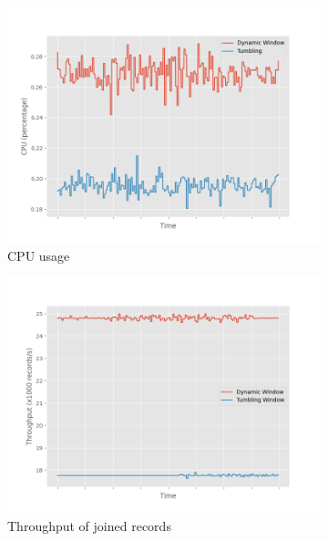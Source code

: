 \begin{figure}
    \begin{subfigure}[b]{0.5\textwidth}
        \includegraphics[width=\textwidth]{fig/periodic/cpu_comparison.png}
        \caption{CPU usage}
        \label{fig:periodic_cpu}
    \end{subfigure}
    \hfill 
    \begin{subfigure}[b]{0.5\textwidth}
        \includegraphics[width=\textwidth]{fig/periodic/throughput_comparison.png}
        \caption{Throughput of joined records}
        \label{fig:periodic_throughput}
    \end{subfigure}
    \begin{subfigure}[b]{0.5\textwidth}

\end{subfigure}
\end{figure}
